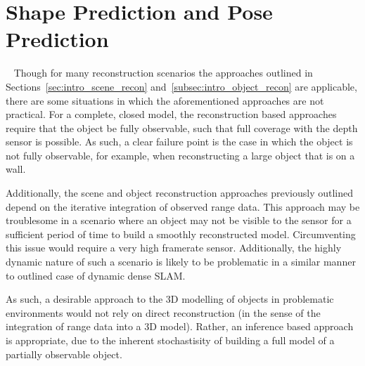 \section{Shape Prediction and Pose Prediction}
~\label{sec:intro_spp}
Though for many reconstruction scenarios the approaches outlined in Sections~\ref{sec:intro_scene_recon} 
and~\ref{subsec:intro_object_recon} are applicable, there are some situations in which the aforementioned 
approaches are not practical. For a complete, closed model, the reconstruction based approaches require that 
the object be fully observable, such that full coverage with the depth sensor is possible. As such, a clear 
failure point is the case in which the object is not fully observable, for example, when reconstructing a large 
object that is on a wall.

Additionally, the scene and object reconstruction approaches previously outlined depend on the iterative 
integration of observed range data. This approach may be troublesome in a scenario where an object may not 
be visible to the sensor for a sufficient period of time to build a smoothly reconstructed model. Circumventing 
this issue would require a very high framerate sensor. Additionally, the highly dynamic nature of such a scenario 
is likely to be problematic in a similar manner to outlined case of dynamic dense SLAM\@.

As such, a desirable approach to the 3D modelling of objects in problematic environments would not rely on 
direct reconstruction (in the sense of the integration of range data into a 3D model). Rather, an inference based 
approach is appropriate, due to the inherent stochastisity of building a full model of a partially observable 
object.

